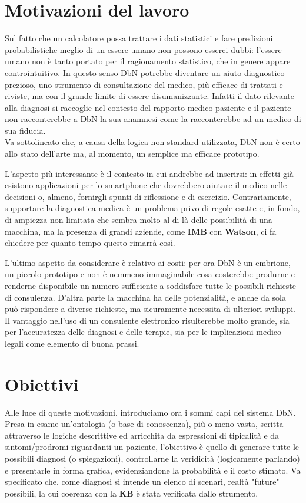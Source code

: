 \section{Motivazioni del lavoro}
Sul fatto che un calcolatore possa trattare i dati statistici e fare predizioni probabilistiche meglio di un essere umano non possono esserci dubbi:
l’essere umano non è tanto portato per il ragionamento statistico, che in genere appare controintuitivo. 
In questo senso DbN potrebbe diventare un aiuto diagnostico prezioso, uno strumento di consultazione del medico, più efficace di trattati e riviste, ma con il grande limite di essere disumanizzante. Infatti il dato rilevante alla diagnosi si raccoglie nel contesto del rapporto medico-paziente e il paziente non racconterebbe a DbN la sua anamnesi come la racconterebbe ad un medico di sua fiducia.\\ 
Va sottolineato che, a causa della logica non standard  utilizzata, DbN non è certo allo stato dell'arte ma, al momento, un semplice ma efficace prototipo.

L’aspetto più interessante è il contesto in cui andrebbe ad inserirsi: in effetti già esistono applicazioni per lo smartphone che dovrebbero aiutare il medico nelle decisioni o, almeno, fornirgli spunti di riflessione e di esercizio. Contrariamente, supportare la diagnostica medica è un problema privo di regole esatte e, in fondo, di ampiezza non limitata che sembra molto al di là delle possibilità di una macchina, ma la presenza di grandi aziende, come \textbf{IMB} con \textbf{Watson}, ci fa chiedere per quanto tempo questo rimarrà così.

L’ultimo aspetto da considerare è relativo ai costi: per ora DbN è un embrione, un piccolo prototipo e non è nemmeno immaginabile cosa costerebbe produrne e renderne disponibile un numero sufficiente a soddisfare tutte le possibili richieste di consulenza. D’altra parte la macchina ha delle potenzialità, e anche da sola può rispondere a diverse richieste, ma sicuramente necessita di ulteriori sviluppi.
Il vantaggio nell'uso di un consulente elettronico risulterebbe molto grande, sia per l’accuratezza delle diagnosi e delle terapie, sia per le implicazioni medico-legali come elemento di buona prassi.

\section{Obiettivi}
Alle luce di queste motivazioni, introduciamo ora i sommi capi del sistema DbN.\\
Presa in esame un'ontologia (o base di conoscenza), più o meno vasta, scritta attraverso le logiche descrittive ed 
arricchita da espressioni di tipicalità e da sintomi/prodromi riguardanti un paziente, l'obiettivo è quello di generare tutte le possibili diagnosi (o spiegazioni), controllarne la veridicità (logicamente parlando) e presentarle in forma grafica, evidenziandone la probabilità e il costo stimato.
Va specificato che, come diagnosi si intende un elenco di scenari, realtà "future" possibili, la cui coerenza con la \textbf{KB} è stata verificata dallo strumento.

